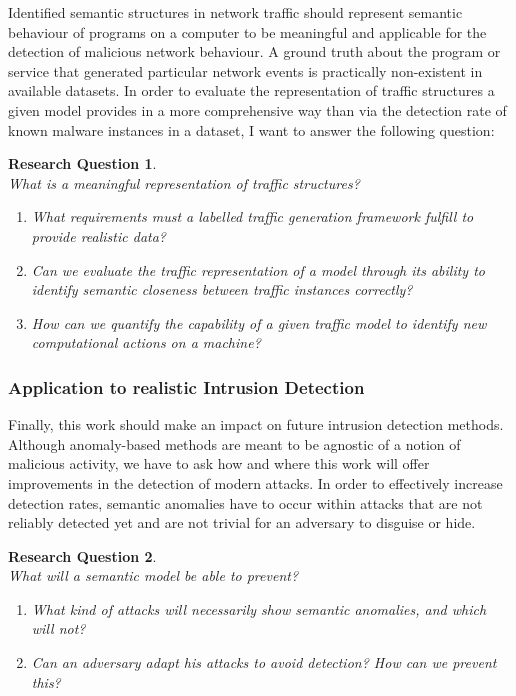 \documentclass[a4paper,12pt,twoside]{report}
\newtheorem{rquestion}{Research Question}
\begin{document}
Identified semantic structures in network traffic should represent semantic behaviour of programs on a computer to be meaningful and applicable for the detection of malicious network behaviour. A ground truth about the program or service that generated particular network events is practically non-existent in available datasets. In order to evaluate the representation of traffic structures a given model provides in a more comprehensive way than via the detection rate of known malware instances in a dataset, I want to answer the following question:

\begin{rquestion}\ \\
What is a meaningful representation of traffic structures?
\begin{enumerate}
\item What requirements must a labelled traffic generation framework fulfill to provide realistic data?
\item Can we evaluate the traffic representation of a model through its ability to identify semantic closeness between traffic instances correctly?
\item How can we quantify the capability of a given traffic model to identify new computational actions on a machine?
\end{enumerate}
\end{rquestion}

\subsubsection{Application to realistic Intrusion Detection}

Finally, this work should make an impact on future intrusion detection methods. Although anomaly-based methods are meant to be agnostic of a notion of malicious activity, we have to ask how and where this work will offer improvements in the detection of modern attacks. In order to effectively increase detection rates, semantic anomalies have to occur within attacks that are not reliably detected yet and are not trivial for an adversary to disguise or hide. 

\begin{rquestion}\ \\
What will a semantic model be able to prevent? 
\begin{enumerate}
\item What kind of attacks will necessarily show semantic anomalies, and which will not?
\item Can an adversary adapt his attacks to avoid detection? How can we prevent this?
\end{enumerate}
\end{rquestion}
\end{document}
